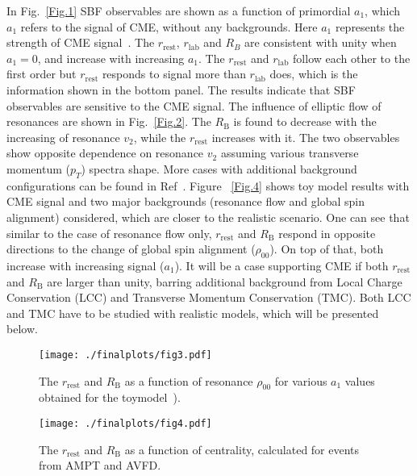 In Fig.~\ref{Fig.1} SBF observables are shown as a function of primordial $a_1$, which $a_1$ refers to the signal of CME, without any backgrounds. Here $a_1$ represents the strength of CME signal~\cite{tang2019probe}. The $r_{\mathrm{rest}}$, $r_{\mathrm{lab}}$ and $R_{B}$ are consistent with unity when $a_{1}=0$, and increase with increasing $a_{1}$. The $r_{\mathrm{rest}}$ and $r_{\mathrm{lab}}$ follow each other to the first order but $r_{\mathrm{rest}}$ responds to signal more than $r_{\mathrm{lab}}$ does, which is the information shown in the bottom panel.  The results indicate that SBF observables are sensitive to the CME signal. 
The influence of elliptic flow of resonances are shown in Fig.~\ref{Fig.2}. The $R_{\mathrm{B}}$  is found to decrease with the increasing of resonance $v_2$, while the $r_{\mathrm{rest}}$  increases with it. The two observables show opposite dependence on resonance $v_2$  assuming various transverse momentum ($p_{T}$) spectra shape.  More cases with additional background configurations can be found in Ref~\cite{tang2019probe}. 
Figure ~\ref{Fig.4} shows toy model results with CME signal and two major backgrounds (resonance flow and global spin alignment) considered, which are  closer to the realistic scenario. One can see that similar to the case of resonance flow only, $r_{\mathrm{rest}}$  and $R_{\mathrm{B}}$ respond in opposite directions to the change of global spin alignment ($\rho_{00}$). On top of that, both increase with increasing signal ($a_1$). It will be a case supporting CME if both $r_{\mathrm{rest}}$ and $R_{\mathrm{B}}$ are larger than unity, barring additional background from Local Charge Conservation (LCC) and Transverse Momentum Conservation (TMC). Both LCC and TMC have to be studied with realistic models, which will be presented below. 


\begin{figure}[htbp!]
\vspace{-0.25cm}
\centering 
\begin{minipage}[b]{0.33\textwidth} %
\centering 
\texttt{[image: ./finalplots/fig3.pdf]}
\caption{ The $r_{\mathrm{rest}}$ and $R_{\mathrm{B}}$ as a function of resonance $\rho_{00}$ for various $a_{1}$ values obtained for the toymodel~\cite{tang2019probe}).}
\label{Fig.4}
\end{minipage}
\hspace{0.45cm}
\begin{minipage}[b]{0.33\textwidth} 
\centering 
\texttt{[image: ./finalplots/fig4.pdf]}
\caption{The $r_{\mathrm{rest}}$ and $R_{\mathrm{B}}$ as a function of centrality, calculated for events from AMPT and AVFD. }
\label{fig:AMPT_AVFD}
\end{minipage}
\end{figure}
\vspace{-0.18cm}

